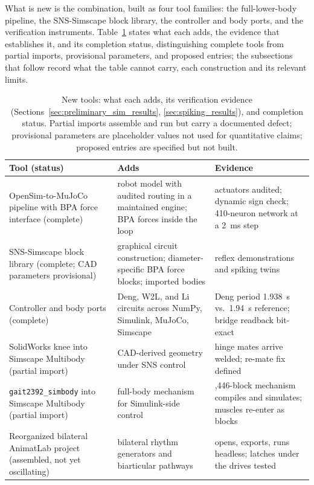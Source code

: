 What is new is the combination, built as four tool families: the full-lower-body pipeline, the SNS-Simscape block library, the controller and body ports, and the verification instruments. Table~\ref{tab:sns_capability} states what each adds, the evidence that establishes it, and its completion status, distinguishing complete tools from partial imports, provisional parameters, and proposed entries; the subsections that follow record what the table cannot carry, each construction and its relevant limits.

\begin{table}[htbp]
\caption{New tools: what each adds, its verification evidence (Sections~\ref{sec:preliminary_sim_results}, \ref{sec:spiking_results}), and completion status. Partial imports assemble and run but carry a documented defect; provisional parameters are placeholder values not used for quantitative claims; proposed entries are specified but not built.}
\label{tab:sns_capability}
\small
\begin{tabularx}{\textwidth}{@{}>{\raggedright\arraybackslash}p{}>{\raggedright\arraybackslash}p{}>{\raggedright\arraybackslash}X@{}}
\toprule
\textbf{Tool (status)} & \textbf{Adds} & \textbf{Evidence} \\
\midrule
OpenSim-to-MuJoCo pipeline with BPA force interface (complete) & robot model with audited routing in a maintained engine; BPA forces inside the loop & 92 actuators audited; dynamic sign check; 410-neuron network at a \qty{2}{\milli\second} step \\
SNS-Simscape block library (complete; CAD parameters provisional) & graphical circuit construction; diameter-specific BPA force blocks; imported bodies & reflex demonstrations and spiking twins \\
Controller and body ports (complete) & Deng, W2L, and Li circuits across NumPy, Simulink, MuJoCo, Simscape & Deng period \qty{1.938}{\second} vs.\ \qty{1.94}{\second} reference; bridge readback bit-exact \\
SolidWorks knee into Simscape Multibody (partial import) & CAD-derived geometry under SNS control & hinge mates arrive welded; re-mate fix defined \\
\texttt{gait2392\_simbody} into Simscape Multibody (partial import) & full-body mechanism for Simulink-side control & 1,446-block mechanism compiles and simulates; muscles re-enter as blocks \\
Reorganized bilateral AnimatLab project (assembled, not yet oscillating) & bilateral rhythm generators and biarticular pathways & opens, exports, runs headless; latches under the drives tested \\

\end{tabularx}
\end{table}
